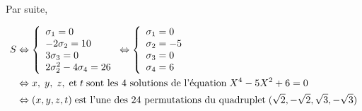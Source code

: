 {{Par suite,

\begin{align*}\ensuremath
S&\Leftrightarrow
\left\{
\begin{array}{l}
\sigma_1=0\\
-2\sigma_2=10\\
3\sigma_3=0\\
2\sigma_2^2-4\sigma_4=26
\end{array}
\right.\Leftrightarrow\left\{
\begin{array}{l}
\sigma_1=0\\
\sigma_2=-5\\
\sigma_3=0\\
\sigma_4=6
\end{array}
\right.\\
 &\Leftrightarrow x,\;y,\;z,\;\mbox{et}\;t\;\mbox{sont les 4 solutions de l'équation}\;X^4-5X^2+6=0\\
 &\Leftrightarrow(x,y,z,t)\;\mbox{est l'une des 24 permutations du quadruplet}\;(\sqrt{2},-\sqrt{2},\sqrt{3},-\sqrt{3})
\end{align*}
}
}
